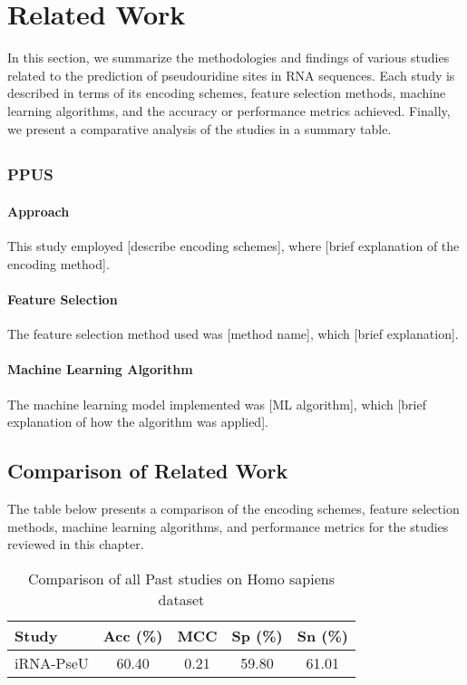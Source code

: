 \chapter{Related Work}\label{ch:related-work}
  In this section, we summarize the methodologies and findings of various studies related to the prediction of pseudouridine sites in RNA sequences.
  Each study is described in terms of its encoding schemes, feature selection methods, machine learning algorithms, and the accuracy or performance metrics achieved.
  Finally, we present a comparative analysis of the studies in a summary table.


  \section{}\label{sec:}

    \subsection{PPUS\cite{li_ppus_2015}}\label{subsec:ppus}
      \subsubsection*{Approach}
        This study employed [describe encoding schemes], where [brief explanation of the encoding method].
      \subsubsection*{Feature Selection}
        The feature selection method used was [method name], which [brief explanation].
      \subsubsection*{Machine Learning Algorithm}
        The machine learning model implemented was [ML algorithm], which [brief explanation of how the algorithm was applied].


  \section{Comparison of Related Work}\label{sec:comparison-of-related-work}
    The table below presents a comparison of the encoding schemes, feature selection methods, machine learning algorithms, and performance metrics for the studies reviewed in this chapter.

    \begin{table}[h!]
      \centering
      \begin{tabular}{lcccc}
        \toprule
        \textbf{Study} & \textbf{Acc} (\%) & \textbf{MCC} & \textbf{Sp} (\%) & \textbf{Sn} (\%) \\
        \midrule
        iRNA-PseU      & 60.40             & 0.21         & 59.80            & 61.01            \\
        \bottomrule
      \end{tabular}
      \caption{Comparison of all Past studies on Homo sapiens dataset}
      \label{tab:human_comp_table}
    \end{table}

